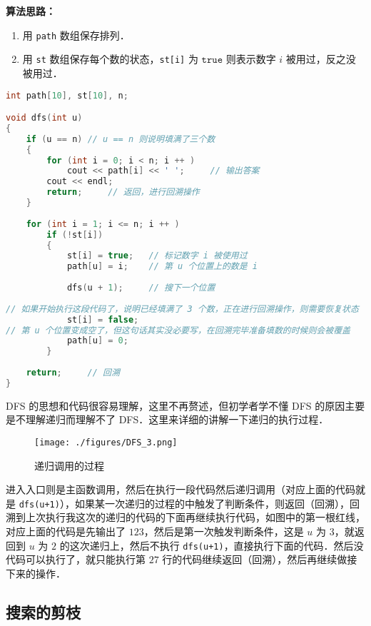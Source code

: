 \textbf{算法思路：}
\begin{enumerate}
\item 用 \verb|path| 数组保存排列．

\item 用 \verb|st| 数组保存每个数的状态，\verb|st[i]| 为 $\mathtt{true}$ 则表示数字 $i$ 被用过，反之没被用过．

\end{enumerate}
\begin{lstlisting}[language=cpp]
int path[10], st[10], n;

void dfs(int u)
{
    if (u == n) // u == n 则说明填满了三个数
    {
        for (int i = 0; i < n; i ++ )
            cout << path[i] << ' ';     // 输出答案
        cout << endl;
        return;     // 返回，进行回溯操作
    }
    
    for (int i = 1; i <= n; i ++ )
        if (!st[i])
        {
            st[i] = true;   // 标记数字 i 被使用过
            path[u] = i;    // 第 u 个位置上的数是 i
            
            dfs(u + 1);     // 搜下一个位置
            
// 如果开始执行这段代码了，说明已经填满了 3 个数，正在进行回溯操作，则需要恢复状态
            st[i] = false;  
// 第 u 个位置变成空了，但这句话其实没必要写，在回溯完毕准备填数的时候则会被覆盖
            path[u] = 0;    
        }
        
    return;     // 回溯
}
\end{lstlisting}

DFS 的思想和代码很容易理解，这里不再赘述，但初学者学不懂 DFS 的原因主要是不理解递归而理解不了 DFS．这里来详细的讲解一下递归的执行过程．

\begin{figure}[ht]
\centering
\texttt{[image: ./figures/DFS\_3.png]}
\caption{递归调用的过程} \label{DFS_fig3}
\end{figure}


进入入口则是主函数调用，然后在执行一段代码然后递归调用（对应上面的代码就是 \verb|dfs(u+1)|），如果某一次递归的过程的中触发了判断条件，则返回（回溯），回溯到上次执行我这次的递归的代码的下面再继续执行代码，如图中的第一根红线，对应上面的代码是先输出了 $1 2 3$，然后是第一次触发判断条件，这是 $u$ 为 $3$，就返回到 $u$ 为 $2$ 的这次递归上，然后不执行 \verb|dfs(u+1)|，直接执行下面的代码．然后没代码可以执行了，就只能执行第 $27$ 行的代码继续返回（回溯），然后再继续做接下来的操作．


\subsection{搜索的剪枝}

